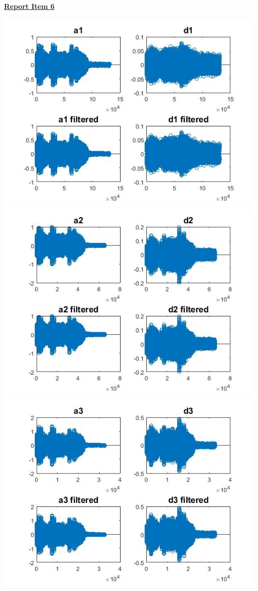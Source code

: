 \documentclass{article}
\begin{document}
\color{red}
\underline{\textbf{Report Item 6}}
\color{black}

\includegraphics[scale=.5]{a1d1}
\includegraphics[scale=.5]{a2d2}
\includegraphics[scale=.5]{a3d3}
\end{document}

